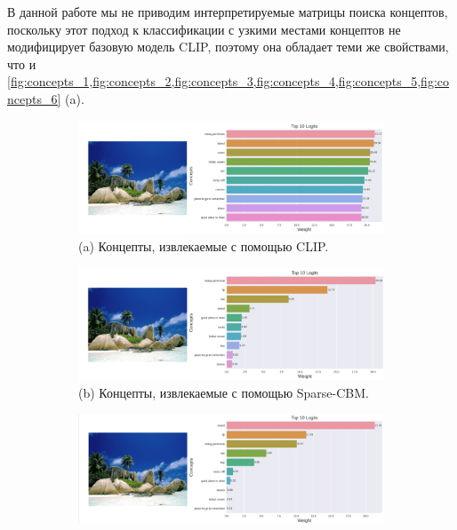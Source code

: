 В данной работе мы не приводим интерпретируемые матрицы поиска концептов, поскольку этот подход к классификации с узкими местами концептов не модифицирует базовую модель CLIP, поэтому она обладает теми же свойствами, что и \cref{fig:concepts_1,fig:concepts_2,fig:concepts_3,fig:concepts_4,fig:concepts_5,fig:concepts_6} (a).
\begin{figure}[h] %
\centering
   \begin{subfigure}%
     \centering
    \includegraphics[width=0.75\linewidth]{./figures/clip_im_1-compressed.png}
    \\
    (a) Концепты, извлекаемые с помощью CLIP.
    \end{subfigure}
    \begin{subfigure}%
    \centering
      \includegraphics[width=0.75\linewidth]{./figures/sparse_im_1-compressed.png}
    \\
    (b) Концепты, извлекаемые с помощью Sparse-CBM.
    \end{subfigure}
    \begin{subfigure}%
     \centering
  \includegraphics[width=0.75\linewidth]{./figures/l1_im1-compressed.png}

\end{subfigure}
\end{figure}
